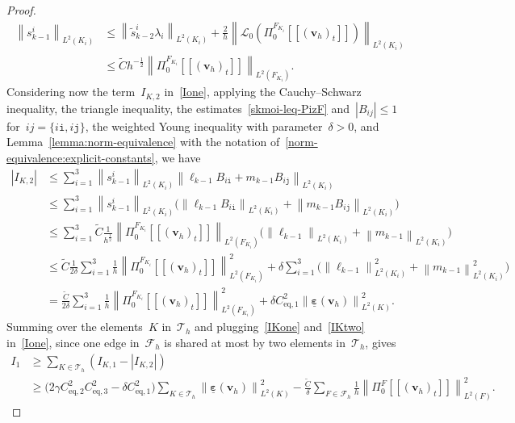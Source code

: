 \documentclass[10pt,a4paper]{amsart}
\newcommand{\Ceqone}{C_{\text{eq},1}}
\newcommand{\Ceqthree}{C_{\text{eq},3}}
\newcommand{\Ceqtwo}{C_{\text{eq},2}}
\newcommand{\Ctilde}{\widetilde{C}}
\newcommand{\F}{F}
\newcommand{\Fcalh}{\mathcal{F}_h}
\newcommand{\Fi}{{\F_{\Ki}}}
\newcommand{\IKone}{I_{\K,1}}
\newcommand{\IKtwo}{I_{\K,2}}
\newcommand{\Ione}{I_1}
\newcommand{\K}{K}
\newcommand{\Ki}{{\K_i}}
\newcommand{\Lcalzero}{\mathcal{L}_0}
\newcommand{\Ltwo}{L^2}
\newcommand{\Norm}[1]{{\left\|{#1} \right\|}}
\newcommand{\PizF}{\Pi_0^{\F}}
\newcommand{\PizFi}{\Pi_0^{\Fi}}
\newcommand{\Tauh}{\mathcal{T}_h}
\newcommand{\epsbfun}{\underline{\boldsymbol{\varepsilon}}}
\newcommand{\itt}{\mathtt{i}}
\newcommand{\jtt}{\mathtt{j}}
\newcommand{\jump}[1]{\left[\!\left[#1\right]\!\right]}
\newcommand{\lambdai}{\lambda_i}
\newcommand{\lkmo}{\ell_{k-1}}
\newcommand{\mkmo}{m_{k-1}}
\newcommand{\skmoi}{s_{k-1}^i}
\newcommand{\stildekmt}{\widetilde{s}_{k-2}}
\newcommand{\stildekmti}{\stildekmt^i}
\newcommand{\tangscalar}{t}
\newcommand{\vbfh}{\mathbf{v}_h}
\begin{document}
\begin{proof}
\begin{equation}
\begin{split}
\Norm{\skmoi}_{\Ltwo(\Ki)}
&\leq\Norm{\stildekmti\lambdai}_{\Ltwo(\Ki)} + \frac{2}{h}\Norm{\Lcalzero(\PizFi\jump{(\vbfh)_{\tangscalar}})}_{\Ltwo(\Ki)} \\
&\leq \Ctilde h^{-\frac12}\Norm{\PizFi\jump{(\vbfh)_{\tangscalar}}}_{\Ltwo(\Fi)}.
\end{split}
\end{equation}
Considering now the term~$\IKtwo$ in~\eqref{Ione},
applying the Cauchy--Schwarz inequality,
the triangle inequality,
the estimates~\eqref{skmoi-leq-PizF}
and~$|B_{ij}| \leq 1$ for~$ij = \{i\itt,i\jtt\}$,
the weighted Young inequality with parameter~$\delta > 0$,
and Lemma~\ref{lemma:norm-equivalence}
with the notation of~\eqref{norm-equivalence:explicit-constants},
we have
\begin{equation} \label{IKtwo}
\begin{split}
|\IKtwo|
&\leq \sum_{i=1}^3 \Norm{\skmoi}_{\Ltwo(\Ki)} \Norm{\lkmo B_{i\itt} + \mkmo B_{i\jtt}}_{\Ltwo(\Ki)} \\
&\leq \sum_{i=1}^3 \Norm{\skmoi}_{\Ltwo(\Ki)} \big(\Norm{\lkmo B_{i\itt}}_{\Ltwo(\Ki)} + \Norm{\mkmo B_{i\jtt}}_{\Ltwo(\Ki)}\big) \\
&\leq \sum_{i=1}^3 \Ctilde \frac{1}{h^{\frac12}} \Norm{\PizFi\jump{(\vbfh)_{\tangscalar}}}_{\Ltwo(\Fi)} \big(\Norm{\lkmo}_{\Ltwo(\Ki)} + \Norm{\mkmo}_{\Ltwo(\Ki)}\big) \\
&\leq \Ctilde\frac{1}{2\delta}\sum_{i=1}^3 \frac{1}{h} \Norm{\PizFi\jump{(\vbfh)_{\tangscalar}}}^2_{\Ltwo(\Fi)}
        + \delta\sum_{i=1}^3 \big(\Norm{\lkmo}_{\Ltwo(\Ki)}^2 + \Norm{\mkmo}_{\Ltwo(\Ki)}^2\big) \\
&= \frac{\Ctilde}{2\delta}\sum_{i=1}^3 \frac{1}{h} \Norm{\PizFi\jump{(\vbfh)_{\tangscalar}}}^2_{\Ltwo(\Fi)}
        + \delta\Ceqone^2\Norm{\epsbfun(\vbfh)}_{\Ltwo(\K)}^2.
\end{split}
\end{equation}
Summing over the elements~$\K$ in~$\Tauh$
and plugging~\eqref{IKone} and~\eqref{IKtwo} in~\eqref{Ione},
since one edge in~$\Fcalh$ is shared at most by two elements in~$\Tauh$,
gives
\begin{equation} \label{Ione-final}
\begin{split}
\Ione
&\geq \sum_{\K\in \Tauh}(\IKone - |\IKtwo|) \\
&\geq \Big(2\gamma\Ceqtwo^2\Ceqthree^2-\delta\Ceqone^2\Big) \sum_{\K\in \Tauh} \Norm{\epsbfun(\vbfh)}_{\Ltwo(\K)}^2
            - \frac{\Ctilde}{\delta}\sum_{\F\in\Fcalh}\frac{1}{h}{\Norm{\PizF\jump{(\vbfh)_{\tangscalar}}}}_{\Ltwo(\F)}^2.
\end{split}
\end{equation}



\end{proof}
\end{document}

